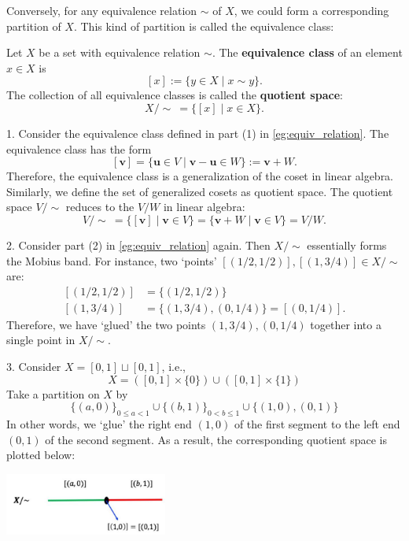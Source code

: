 Conversely, for any equivalence relation \(\sim\) of $X$, we could form a corresponding partition of \(X\). This kind of partition is called the equivalence class:
\begin{definition} Let \(X\) be a set with equivalence relation \(\sim\). The {\bf equivalence class} of an element \(x \in  X\) is
\[
\left\lbrack  x\right\rbrack   \mathrel{\text{:= }} \{ y \in  X \mid  x \sim  y\}.
\]
The collection of all equivalence classes is called the {\bf quotient space}:
\[
X/\sim\:= \{ \left\lbrack  x\right\rbrack   \mid  x \in  X\}.
\]
\end{definition}

\begin{example}
1. Consider the equivalence class defined in part (1) in \autoref{eg:equiv_relation}. The equivalence class has the form
\[
\left\lbrack  \mathbf{v}\right\rbrack   = \{ \mathbf{u} \in  V \mid  \mathbf{v} - \mathbf{u} \in  W\}  \mathrel{\text{:= }} \mathbf{v} + W.
\]
Therefore, the equivalence class is a generalization of the coset in linear algebra. Similarly, we define the set of generalized cosets as quotient space.
The quotient space \(V/ \sim\) reduces to the \(V/W\) in linear algebra:
\[
V/ \sim\   = \{ \left\lbrack  \mathbf{v}\right\rbrack   \mid  \mathbf{v} \in  V\}  = \{ \mathbf{v} + W \mid  \mathbf{v} \in  V\}  = V/W.
\]

2. Consider part (2) in \autoref{eg:equiv_relation} again. Then \(X/ \sim\) essentially forms the Mobius band. For instance, two `points' $\left\lbrack  \left( {1/2,1/2}\right) \right\rbrack, \left\lbrack  \left( {1,3/4}\right) \right\rbrack \in X/ \sim$ are:
\begin{align*}
\left\lbrack  \left( {1/2,1/2}\right) \right\rbrack   &= \{ \left( {1/2,1/2}\right) \} \\
\left\lbrack  \left( {1,3/4}\right) \right\rbrack   &= \{ \left( {1,3/4}\right),\left( {0,1/4}\right) \} = \left\lbrack  \left( {0,1/4}\right) \right\rbrack.
\end{align*}
Therefore, we have `glued' the two points $\left( {1,3/4}\right),\left( {0,1/4}\right)$ together into a single point in $X/\sim$.

3. Consider \(X = \left\lbrack  {0,1}\right\rbrack   \sqcup  \left\lbrack  {0,1}\right\rbrack\), i.e.,
\[
X = \left( {\left\lbrack  {0,1}\right\rbrack  \times \{ 0\} }\right)  \cup  \left( {\left\lbrack  {0,1}\right\rbrack  \times \{ 1\} }\right)
\] 
Take a partition on \(X\) by
\[
\{ \left( {a,0}\right) {\} }_{0 \leq  a < 1} \cup  \{ \left( {b,1}\right) {\} }_{0 < b \leq  1} \cup  \{ \left( {1,0}\right),\left( {0,1}\right) \}
\]
In other words, we `glue' the right end $(1,0)$ of the first segment to the left end $(0,1)$ of the second segment. As a result, the corresponding quotient space is plotted below:
\begin{center}
\includegraphics[width=0.4\textwidth]{images/Ch4_two_lines.jpg}
\end{center}


\end{example}
